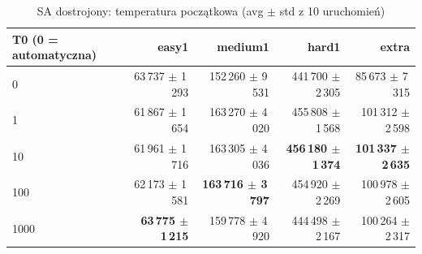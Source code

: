 \begin{table}[H]
  \centering
  \small
  \caption{SA dostrojony: temperatura początkowa (avg $\pm$ std z 10 uruchomień)}
  \label{tab:sa-t0}
  \begin{tabular}{lrrrr}
    \toprule
    T0 (0 = automatyczna) & easy1 & medium1 & hard1 & extra \\
    \midrule
    0 & 63\,737 $\pm$ 1\,293 & 152\,260 $\pm$ 9\,531 & 441\,700 $\pm$ 2\,305 & 85\,673 $\pm$ 7\,315 \\
    1 & 61\,867 $\pm$ 1\,654 & 163\,270 $\pm$ 4\,020 & 455\,808 $\pm$ 1\,568 & 101\,312 $\pm$ 2\,598 \\
    10 & 61\,961 $\pm$ 1\,716 & 163\,305 $\pm$ 4\,036 & \textbf{456\,180 $\pm$ 1\,374} & \textbf{101\,337 $\pm$ 2\,635} \\
    100 & 62\,173 $\pm$ 1\,581 & \textbf{163\,716 $\pm$ 3\,797} & 454\,920 $\pm$ 2\,269 & 100\,978 $\pm$ 2\,605 \\
    1000 & \textbf{63\,775 $\pm$ 1\,215} & 159\,778 $\pm$ 4\,920 & 444\,498 $\pm$ 2\,167 & 100\,264 $\pm$ 2\,317 \\
    \bottomrule
  \end{tabular}
\end{table}

